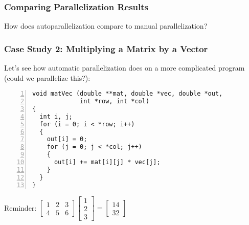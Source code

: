 \documentclass[aspectratio=43]{beamer}
\newenvironment{changemargin}[1]{%
  \begin{list}{}{%
    \setlength{\topsep}{0pt}%
    \setlength{\leftmargin}{#1}%
    \setlength{\rightmargin}{1em}
    \setlength{\listparindent}{\parindent}%
    \setlength{\itemindent}{\parindent}%
    \setlength{\parsep}{\parskip}%
  }%
  \item[]}{\end{list}}
\begin{document}
\begin{frame}[fragile]
  \frametitle{Comparing Parallelization Results}

\begin{changemargin}{1.5cm}
How does autoparallelization compare to manual parallelization?
\end{changemargin}

\end{frame}



\begin{frame}[fragile]
  \frametitle{Case Study 2: Multiplying a Matrix by a Vector}

\begin{changemargin}{1.5cm}
Let's see how automatic parallelization does on a more complicated
program (could we parallelize this?):

  \begin{lstlisting}[numbers=left]
void matVec (double **mat, double *vec, double *out,
             int *row, int *col) 
{
  int i, j;
  for (i = 0; i < *row; i++)
  {
    out[i] = 0;
    for (j = 0; j < *col; j++)
    {
      out[i] += mat[i][j] * vec[j];
    }
  }
}
  \end{lstlisting}
\end{changemargin}

  \begin{center}
    Reminder:
    \begin{math}
      \begin{bmatrix} 1 & 2 & 3 \\ 4 & 5 & 6\end{bmatrix}
      \begin{bmatrix} 1 \\ 2 \\ 3 \end{bmatrix}
      =
      \begin{bmatrix} 14 \\ 32 \end{bmatrix}
    \end{math}
  \end{center}

\end{frame}
\end{document}
